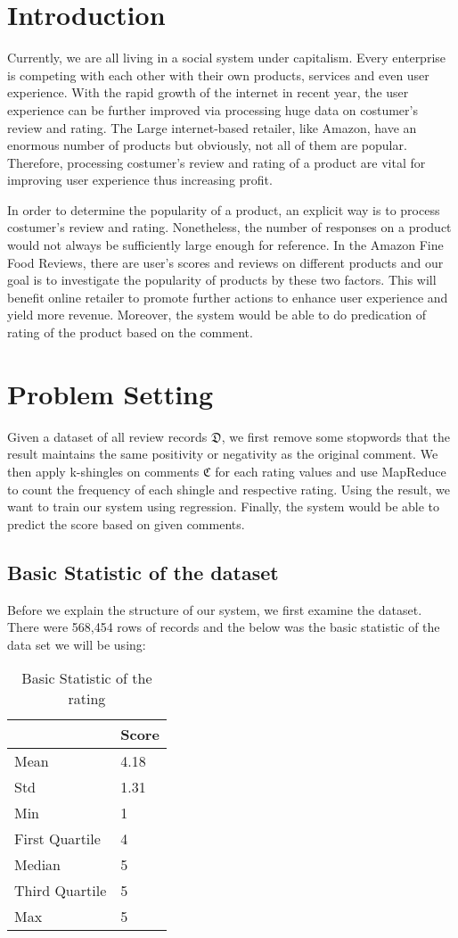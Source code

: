 \section{Introduction}
Currently, we are all living in a social system under capitalism. Every enterprise is competing with each other with their own products, services and even user experience. With the rapid growth of the internet in recent year, the user experience can be further improved via processing huge data on costumer's review and rating. The Large internet-based retailer, like Amazon, have an enormous number of products but obviously, not all of them are popular. Therefore, processing costumer's review and rating of a product are vital for improving user experience thus increasing profit.

In order to determine the popularity of a product, an explicit way is to process costumer's review and rating. Nonetheless, the number of responses on a product would not always be sufficiently large enough for reference. In the Amazon Fine Food Reviews, there are user's scores and reviews on different products and our goal is to investigate the popularity of products by these two factors. This will benefit online retailer to promote further actions to enhance user experience and yield more revenue. Moreover, the system would be able to do predication of rating of the product based on the comment.


\section{Problem Setting}
Given a dataset of all review records \(\mathfrak{D}\), we first remove some stopwords that the result maintains the same positivity or negativity as the original comment. We then apply k-shingles on comments \(\mathfrak{C}\) for each rating values and use MapReduce to count the frequency of each shingle and respective rating. Using the result, we want to train our system using regression. Finally, the system would be able to predict the score based on given comments.

\subsection{Basic Statistic of the dataset}
Before we explain the structure of our system, we first examine the dataset. There were 568,454 rows of records and the below was the basic statistic of the data set we will be using:
\begin{table}[H]
  \caption{Basic Statistic of the rating}
  \label{tab:commands}
  \begin{tabular}{ll}
  	\toprule
    & Score \\ 
    \midrule
    Mean & 4.18 \\
    Std & 1.31 \\ 
    Min & 1 \\
    First Quartile & 4 \\
    Median & 5 \\
    Third Quartile & 5 \\
    Max & 5 \\ 
    \bottomrule
  \end{tabular}
\end{table}

